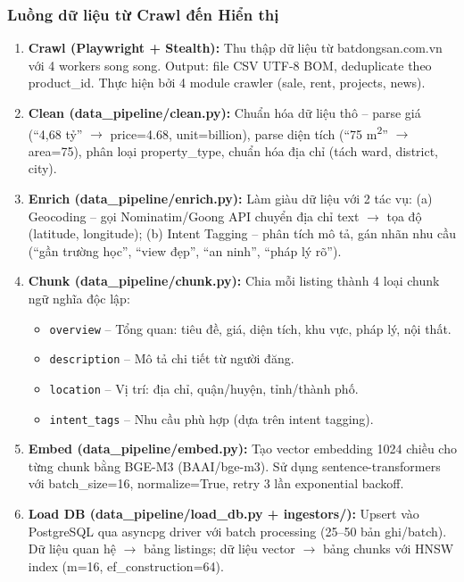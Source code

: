 \subsubsection*{Luồng dữ liệu từ Crawl đến Hiển thị}

\begin{enumerate}
    \item \textbf{Crawl (Playwright + Stealth):} Thu thập dữ liệu từ batdongsan.com.vn với 4 workers song song. Output: file CSV UTF-8 BOM, deduplicate theo product\_id. Thực hiện bởi 4 module crawler (sale, rent, projects, news).

    \item \textbf{Clean (data\_pipeline/clean.py):} Chuẩn hóa dữ liệu thô -- parse giá (``4,68 tỷ'' $\rightarrow$ price=4.68, unit=billion), parse diện tích (``75 m\textsuperscript{2}'' $\rightarrow$ area=75), phân loại property\_type, chuẩn hóa địa chỉ (tách ward, district, city).

    \item \textbf{Enrich (data\_pipeline/enrich.py):} Làm giàu dữ liệu với 2 tác vụ: (a) Geocoding -- gọi Nominatim/Goong API chuyển địa chỉ text $\rightarrow$ tọa độ (latitude, longitude); (b) Intent Tagging -- phân tích mô tả, gán nhãn nhu cầu (``gần trường học'', ``view đẹp'', ``an ninh'', ``pháp lý rõ'').

    \item \textbf{Chunk (data\_pipeline/chunk.py):} Chia mỗi listing thành 4 loại chunk ngữ nghĩa độc lập:
    \begin{itemize}
        \item \texttt{overview} -- Tổng quan: tiêu đề, giá, diện tích, khu vực, pháp lý, nội thất.
        \item \texttt{description} -- Mô tả chi tiết từ người đăng.
        \item \texttt{location} -- Vị trí: địa chỉ, quận/huyện, tỉnh/thành phố.
        \item \texttt{intent\_tags} -- Nhu cầu phù hợp (dựa trên intent tagging).
    \end{itemize}

    \item \textbf{Embed (data\_pipeline/embed.py):} Tạo vector embedding 1024 chiều cho từng chunk bằng BGE-M3 (BAAI/bge-m3). Sử dụng sentence-transformers với batch\_size=16, normalize=True, retry 3 lần exponential backoff.

    \item \textbf{Load DB (data\_pipeline/load\_db.py + ingestors/):} Upsert vào PostgreSQL qua asyncpg driver với batch processing (25--50 bản ghi/batch). Dữ liệu quan hệ $\rightarrow$ bảng listings; dữ liệu vector $\rightarrow$ bảng chunks với HNSW index (m=16, ef\_construction=64).


\end{enumerate}

